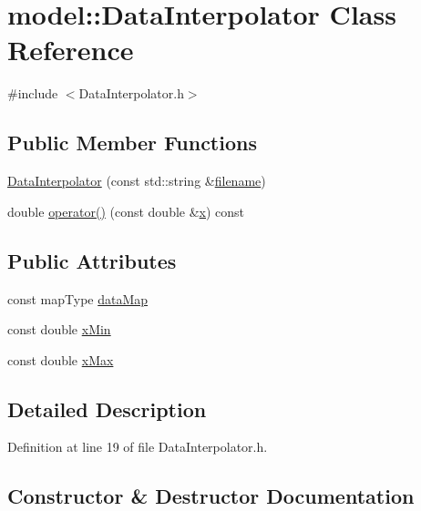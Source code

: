 \hypertarget{classmodel_1_1_data_interpolator}{}\section{model\+:\+:Data\+Interpolator Class Reference}
\label{classmodel_1_1_data_interpolator}


{\ttfamily \#include $<$Data\+Interpolator.\+h$>$}

\subsection*{Public Member Functions}
\begin{DoxyCompactItemize}
\item 
\hyperlink{classmodel_1_1_data_interpolator_a5afcfb0c78426f273c8523ac93c9c4d7}{Data\+Interpolator} (const std\+::string \&\hyperlink{_f_e_m_2linear__elasticity__3d_2tetgen_2generate_p_o_l_ycube_8m_a221163590ee33005cb379c7bec93f1ec}{filename})
\item 
double \hyperlink{classmodel_1_1_data_interpolator_a9c85f5eb408a728ae1461b8cab1598b6}{operator()} (const double \&\hyperlink{generate_s_t_lcyl_8m_a9336ebf25087d91c818ee6e9ec29f8c1}{x}) const 
\end{DoxyCompactItemize}
\subsection*{Public Attributes}
\begin{DoxyCompactItemize}
\item 
const map\+Type \hyperlink{classmodel_1_1_data_interpolator_a8792cf75c688d4834522a063392a4c45}{data\+Map}
\item 
const double \hyperlink{classmodel_1_1_data_interpolator_a809d0d89dbfa011a34b38d8525016fb5}{x\+Min}
\item 
const double \hyperlink{classmodel_1_1_data_interpolator_a4809d3bc604654822943169bc5d84261}{x\+Max}
\end{DoxyCompactItemize}


\subsection{Detailed Description}


Definition at line 19 of file Data\+Interpolator.\+h.



\subsection{Constructor \& Destructor Documentation}
\hypertarget{classmodel_1_1_data_interpolator_a5afcfb0c78426f273c8523ac93c9c4d7}{}
